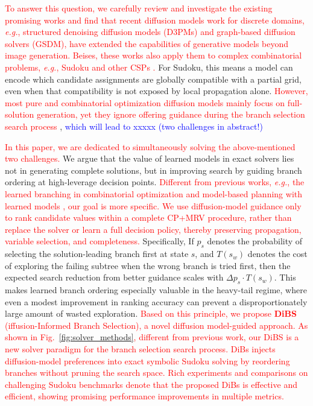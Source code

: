\documentclass[lettersize,journal]{IEEEtran}
\newcommand{\hfj}[1]{\textcolor{red}{#1}}
\begin{document}
\hfj{To answer this question, we carefully review and investigate the existing promising works and find that recent diffusion models work for discrete domains, \textit{e.g.}, structured denoising diffusion models (D3PMs) and graph-based diffusion solvers (GSDM), have extended the capabilities of generative models beyond image generation. Beises, these works also apply them to complex combinatorial problems, \textit{e.g.}, Sudoku and other CSPs \cite{ho2020denoising, austin2021structured, weilbach2023graphically}.} For Sudoku, this means a model can encode which candidate assignments are globally compatible with a partial grid, even when that compatibility is not exposed by local propagation alone. \hfj{However, most pure and combinatorial optimization diffusion models mainly focus on full-solution generation, yet they ignore offering guidance during the branch selection search process \cite{sun2023difusco, ye2025beyond}}, \textcolor{blue}{which will lead to xxxxx (two challenges in abstract!)}


\hfj{In this paper, we are dedicated to simultaneously solving the above-mentioned two challenges.} We argue that the value of learned models in exact solvers lies not in generating complete solutions, but in improving search by guiding branch ordering at high-leverage decision points.
\hfj{Different from previous works, \textit{e.g.}, the learned branching in combinatorial optimization \cite{khalil2016learning, gasse2019exact} and model-based planning with learned models \cite{schrittwieser2020muzero, janner2022diffuser}, our goal is more specific. We use diffusion-model guidance only to rank candidate values within a complete CP+MRV procedure, rather than replace the solver or learn a full decision policy, thereby preserving propagation, variable selection, and completeness.} Specifically, If \(p_s\) denotes the probability of selecting the solution-leading branch first at state \(s\), and \(T(s_w)\) denotes the cost of exploring the failing subtree when the wrong branch is tried first, then the expected search reduction from better guidance scales with \(\Delta p_s \cdot T(s_w)\). This makes learned branch ordering especially valuable in the heavy-tail regime, where even a modest improvement in ranking accuracy can prevent a disproportionately large amount of wasted exploration. \hfj{Based on this principle, we propose \textbf{DiBS} (iffusion-Informed Branch Selection), a novel diffusion model-guided approach. As shown in Fig.~\ref{fig:solver_methods}, different from previous work, our DiBS is a new solver paradigm for the branch selection search process. DiBs injects diffusion-model preferences into exact symbolic Sudoku solving by reordering branches without pruning the search space. Rich experiments and comparisons on challenging Sudoku benchmarks denote that the proposed DiBs is effective and efficient, showing promising performance improvements in multiple metrics.}
\end{document}
